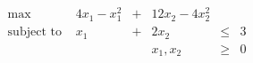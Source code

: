 {\newpage\clearpage
{}%
\begin{displaymath}
       \begin{array}{lccccl}
         \max & 4x_1 - x_1^2 & + & 12x_2 - 4x_2^2 \\
         \mbox{subject to } & x_1 & + & 2x_2 & \leq & 3 \\
                            &&& x_1, x_2 & \geq & 0
       \end{array}
     \end{displaymath}%
\lthtmldisplayZ
\hfill\lthtmlcheckvsize\clearpage}



